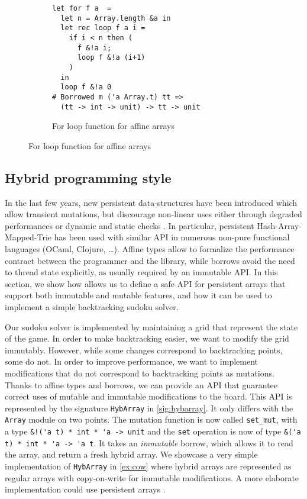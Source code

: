 \begin{figure}
  \centering
  \begin{subfigure}{0.5\linewidth}
\begin{lstlisting}
let for f a  = 
  let n = Array.length &a in
  let rec loop f a i = 
    if i < n then (
      f &!a i;
      loop f &!a (i+1)
    )
  in
  loop f &!a 0
# Borrowed m ('a Array.t) tt =>
  (tt -> int -> unit) -> tt -> unit
\end{lstlisting}
    \caption{For loop function for affine arrays}
    \label{ex:array}
  \end{subfigure}
\end{figure}

\subsection{Hybrid programming style}

In the last few years, new persistent data-structures
have been introduced which allow transient mutations, but discourage
non-linear uses either through degraded performances
\cite{DBLP:conf/ml/ConchonF07} or
dynamic and static checks \cite{DBLP:journals/pacmpl/Puente17}.
In particular, persistent Hash-Array-Mapped-Trie has been used with similar
API in numerous non-pure functional languages (OCaml, Clojure, \dots).
Affine types allow to formalize the performance contract between the programmer
and the library, while borrows avoid the need to thread state explicitly,
as usually required by an immutable API.
%
In this section, we show how \lang allows us to define
a safe API for persistent arrays that support both immutable and mutable features,
and how it can be used to implement a simple backtracking sudoku solver.

Our sudoku solver is implemented by maintaining a grid that represent the state of the game. In order to make backtracking easier, we want to modify the grid immutably. However, while some changes correspond to backtracking points,
some do not.
In order to improve performance, we want to implement modifications
that do not correspond to backtracking points as mutations.
Thanks to affine types and borrows, we can provide an API that guarantee correct
uses of mutable and immutable modifications to the board.
This API is represented by the signature \lstinline/HybArray/ in \cref{sig:hybarray}.
It only differs with the \lstinline/Array/ module on two points.
The mutation function is now called \lstinline/set_mut/, with
a type \lstinline/&!('a t) * int * 'a -> unit/ and
the \lstinline/set/ operation
is now of type \lstinline/&('a t) * int * 'a -> 'a t/. It
takes an \emph{immutable} borrow, which allows it to read the array, and
return a fresh hybrid array.
We showcase a very simple implementation of \lstinline/HybArray/ in
\cref{ex:cow} where hybrid arrays are represented
as regular arrays with copy-on-write for immutable
modifications.
A more elaborate implementation could use persistent arrays
\cite{DBLP:conf/ml/ConchonF07}.


